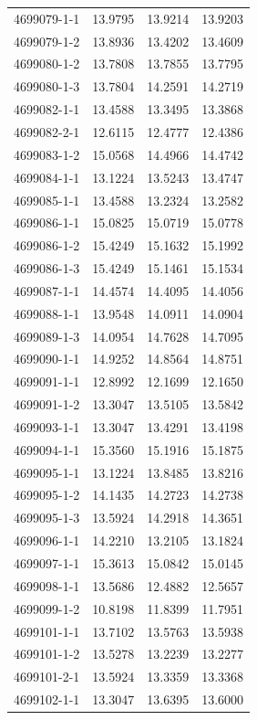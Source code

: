 \begin{longtable}{lrrr}
4699079-1-1 & 13.9795 & 13.9214 & 13.9203 \\
4699079-1-2 & 13.8936 & 13.4202 & 13.4609 \\
4699080-1-2 & 13.7808 & 13.7855 & 13.7795 \\
4699080-1-3 & 13.7804 & 14.2591 & 14.2719 \\
4699082-1-1 & 13.4588 & 13.3495 & 13.3868 \\
4699082-2-1 & 12.6115 & 12.4777 & 12.4386 \\
4699083-1-2 & 15.0568 & 14.4966 & 14.4742 \\
4699084-1-1 & 13.1224 & 13.5243 & 13.4747 \\
4699085-1-1 & 13.4588 & 13.2324 & 13.2582 \\
4699086-1-1 & 15.0825 & 15.0719 & 15.0778 \\
4699086-1-2 & 15.4249 & 15.1632 & 15.1992 \\
4699086-1-3 & 15.4249 & 15.1461 & 15.1534 \\
4699087-1-1 & 14.4574 & 14.4095 & 14.4056 \\
4699088-1-1 & 13.9548 & 14.0911 & 14.0904 \\
4699089-1-3 & 14.0954 & 14.7628 & 14.7095 \\
4699090-1-1 & 14.9252 & 14.8564 & 14.8751 \\
4699091-1-1 & 12.8992 & 12.1699 & 12.1650 \\
4699091-1-2 & 13.3047 & 13.5105 & 13.5842 \\
4699093-1-1 & 13.3047 & 13.4291 & 13.4198 \\
4699094-1-1 & 15.3560 & 15.1916 & 15.1875 \\
4699095-1-1 & 13.1224 & 13.8485 & 13.8216 \\
4699095-1-2 & 14.1435 & 14.2723 & 14.2738 \\
4699095-1-3 & 13.5924 & 14.2918 & 14.3651 \\
4699096-1-1 & 14.2210 & 13.2105 & 13.1824 \\
4699097-1-1 & 15.3613 & 15.0842 & 15.0145 \\
4699098-1-1 & 13.5686 & 12.4882 & 12.5657 \\
4699099-1-2 & 10.8198 & 11.8399 & 11.7951 \\
4699101-1-1 & 13.7102 & 13.5763 & 13.5938 \\
4699101-1-2 & 13.5278 & 13.2239 & 13.2277 \\
4699101-2-1 & 13.5924 & 13.3359 & 13.3368 \\
4699102-1-1 & 13.3047 & 13.6395 & 13.6000 \\

\end{longtable}
